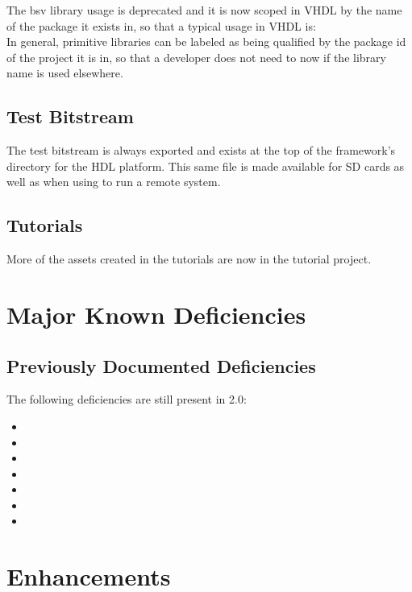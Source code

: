 The bsv library usage is deprecated and it is now scoped in VHDL by the name of the package it exists in, so that a typical usage in VHDL is: \\

In general, primitive libraries can be labeled as being qualified by the package id of the project it is in, so that a developer does not need to now if the library name is used elsewhere.

\subsection{Test Bitstream }
\label{sec:20_testbias}
The test bitstream  is always exported and exists at the top of the framework's directory for the HDL platform. This same file is made available for SD cards as well as when using  to run a remote system.

\subsection{Tutorials}
\label{sec:20_tutorials}
More of the assets created in the tutorials are now in the tutorial project.

\section{Major Known Deficiencies}
\label{sec:20_bugs}

\subsection{Previously Documented Deficiencies}
The following deficiencies are still present in 2.0:
\begin{itemize}
\setlength\itemsep{0em} %
\item {}
\item {}
\item {}
\item {}
\item {}
\item {}
\item {}
\end{itemize}


\def\ocpiversion{v1.7.0}
\section{Enhancements}
